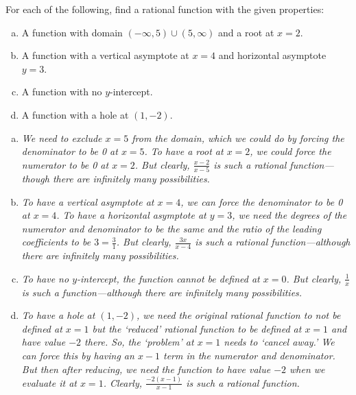 \documentclass[11pt,letterpaper]{article}
\begin{document}
\newpage



 For each of the following, find a rational function with the given properties: 
	\begin{enumerate}[(a)]
	\item A function with domain $(-\infty, 5) \cup (5, \infty)$ and a root at $x= 2$.
	\item A function with a vertical asymptote at $x= 4$ and horizontal asymptote $y= 3$.
	\item A function with no $y$-intercept.
	\item A function with a hole at $(1, -2)$.
	\end{enumerate} \par

 \par

\begin{enumerate}[(a)]
\item {\itshape We need to exclude $x= 5$ from the domain, which we could do by forcing the denominator to be 0 at $x= 5$. To have a root at $x= 2$, we could force the numerator to be 0 at $x= 2$. But clearly, $\tfrac{x - 2}{x - 5}$ is such a rational function---though there are infinitely many possibilities. }

\item {\itshape To have a vertical asymptote at $x= 4$, we can force the denominator to be 0 at $x= 4$. To have a horizontal asymptote at $y= 3$, we need the degrees of the numerator and denominator to be the same and the ratio of the leading coefficients to be $3= \tfrac{3}{1}$. But clearly, $\tfrac{3x}{x - 4}$ is such a rational function---although there are infinitely many possibilities.}

\item {\itshape To have no $y$-intercept, the function cannot be defined at $x= 0$. But clearly, $\tfrac{1}{x}$ is such a function---although there are infinitely many possibilities.}

\item {\itshape To have a hole at $(1, -2)$, we need the original rational function to not be defined at $x= 1$ but the `reduced' rational function to be defined at $x= 1$ and have value $-2$ there. So, the `problem' at $x= 1$ needs to `cancel away.' We can force this by having an $x - 1$ term in the numerator and denominator. But then after reducing, we need the function to have value $-2$ when we evaluate it at $x= 1$. Clearly, $\tfrac{-2(x - 1)}{x - 1}$ is such a rational function.}
\end{enumerate}
\end{document}
